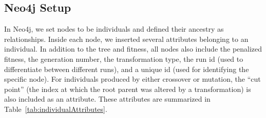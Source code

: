 \documentclass[12pt]{article}
\begin{document}
\subsection{Neo4j Setup}
\label{sec:Neo4jSetup}

In Neo4j, we set nodes to be individuals and defined their ancestry as relationships. Inside each node, we inserted several attributes belonging to an individual. In addition to the tree and fitness, all nodes also include the penalized fitness, the generation number, the transformation type, the run id (used to differentiate between different runs), and a unique id (used for identifying the specific node). For individuals produced by either crossover or mutation, the ``cut point'' (the index at which the root parent was altered by a transformation) is also included as an attribute. These attributes are summarized in Table~\ref{tab:individualAttributes}.
\begin{table}[tb]
\begin{center}
\caption{Chart summarizing attributes that are recorded for individuals produced by each transformation type.}
\label{tab:individualAttributes}
\end{center}
\end{table}
\end{document}
